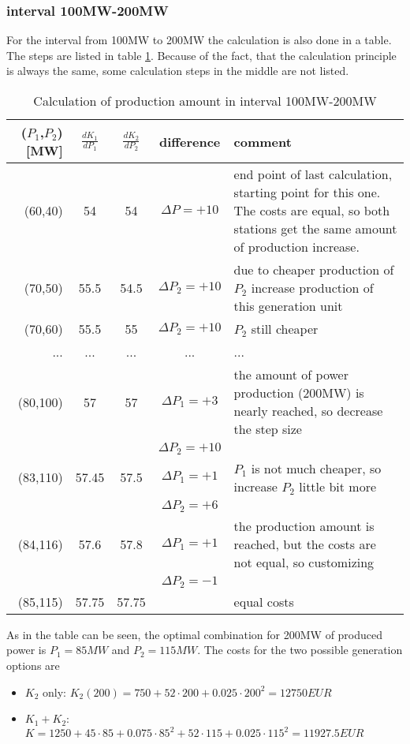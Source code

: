 \documentclass{article}
\begin{document}
	\subsubsection{interval 100MW-200MW}
For the interval from 100MW to 200MW the calculation is also done in a table. The steps are listed in table \ref{tab:100200MW}. Because of the fact, that the calculation principle is always the same, some calculation steps in the middle are not listed.
	\begin{table}[hbt!]
		\begin{center}
			\begin{tabular}[h]{|r||c|c|c||p{5cm}|}
				\hline 
				($P_1$,$P_2$) [MW] & $\frac{dK_1}{dP_1}$ & $\frac{dK_2}{dP_2}$ & difference & comment\\
				\hline
				\hline
				(60,40) &	54		&	54		&	$\Delta P=+10$		&	end point of last calculation, starting point for this one. The costs are equal, so both stations get the same amount of production increase.\\
				\hline
				(70,50) & 	55.5	&	54.5	&	$\Delta P_2=+10$	&	due to cheaper production of $P_2$ increase production of this generation unit\\
				\hline
				(70,60) & 	55.5	&	55		&	$\Delta P_2=+10$	&	$P_2$ still cheaper\\
				\hline
				...		&	...		&	...		&	...					&		...		\\
				\hline
				(80,100)&	57		&	57		&	$\Delta P_1=+3$		&	the amount of power production (200MW) is nearly reached, so decrease the step size\\
						&			&			&	$\Delta P_2=+10$	&	\\
				\hline
				(83,110)&	57.45	&	57.5	&	$\Delta P_1=+1$		&	$P_1$ is not much cheaper, so increase $P_2$ little bit more\\
						&			&			&	$\Delta P_2=+6$		&	\\
				\hline
				(84,116)&	57.6	&	57.8	&	$\Delta P_1=+1$		&	the production amount is reached, but the costs are not equal, so customizing\\
						&			&			&	$\Delta P_2=-1$		&	\\
				\hline
				(85,115)&	57.75 	&	57.75	&						& equal costs\\
				\hline
			\end{tabular}
			\caption{Calculation of production amount in interval 100MW-200MW}\label{tab:100200MW}
		\end{center}
	\end{table}
	As in the table can be seen, the optimal combination for 200MW of produced power is $P_1=85MW$ and $P_2=115MW$. The costs for the two possible generation options are
		\begin{itemize}
			\item $K_2$ only: $K_2(200)=750+52\cdot 200+0.025\cdot 200^2=12750EUR$
			\item $K_1+K_2$: $K=1250+45\cdot 85+0.075\cdot 85^2 + 52\cdot 115+0.025\cdot 115^2=11927.5EUR$
		\end{itemize}
\end{document}
